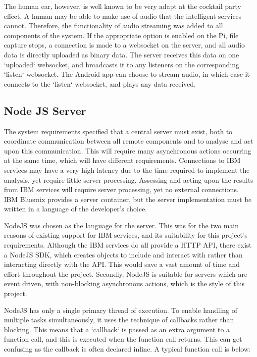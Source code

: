 \documentclass{article}
\begin{document}
The human ear, however, is well known to be very adapt at the cocktail party effect\cite{cocktailParty}. A human may be able to make use of audio that the intelligent services cannot. Therefore, the functionality of audio streaming was added to all components of the system. If the appropriate option is enabled on the Pi, file capture stops, a connection is made to a websocket on the server, and all audio data is directly uploaded as binary data. The server receives this data on one `uploaded` websocket, and broadcasts it to any listeners on the corresponding `listen` websocket. The Android app can choose to stream audio, in which case it connects to the `listen` websocket, and plays any data received.

\subsection{Node JS Server}
The system requirements specified that a central server must exist, both to coordinate communication between all remote components and to analyse and act upon this communication. This will require many asynchronous actions occurring at the same time, which will have different requirements. Connections to IBM services may have a very high latency due to the time required to implement the analysis, yet require little server processing. Assessing and acting upon the results from IBM services will require server processing, yet no external connections. IBM Bluemix provides a server container, but the server implementation must be written in a language of the developer's choice. 

NodeJS was chosen as the language for the server. This was for the two main reasons of existing support for IBM services, and its suitability for this project's requirements. Although the IBM services do all provide a HTTP API, there exist a NodeJS SDK, which creates objects to include and interact with rather than interacting directly with the API\cite{githubWatsonCloud}\cite{githubCloudant}\cite{githubDB2}. This would save a vast amount of time and effort throughout the project. Secondly, NodeJS is suitable for servers which are event driven, with non-blocking asynchronous actions\cite{smackdownPHPNodejs}, which is the style of this project.

NodeJS has only a single primary thread of execution. To enable handling of multiple tasks simultaneously, it uses the technique of callbacks rather than blocking. This means that a `callback` is passed as an extra argument to a function call, and this is executed when the function call returns. This can get confusing as the callback is often declared inline. A typical function call is below:
\end{document}
